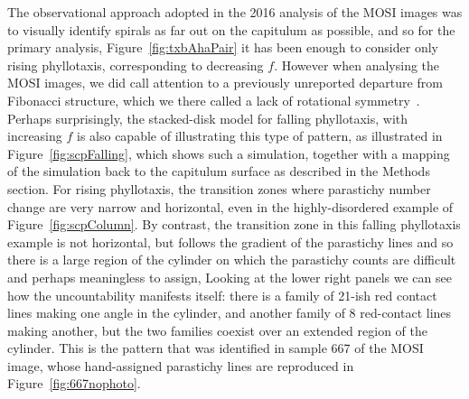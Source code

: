 The observational approach adopted in the 2016 analysis of the MOSI images was to visually identify spirals as far out on the capitulum as possible, and so for the primary analysis, Figure~\ref{fig:txbAhaPair} it has been enough to consider only rising phyllotaxis, corresponding to decreasing $f$. 
However when analysing the MOSI images, we did call attention to a previously unreported departure from Fibonacci structure, which we there called a lack of rotational symmetry~\cite{swintonNovelFibonacciNonFibonacci2016}. Perhaps surprisingly, the stacked-disk model for falling phyllotaxis, with increasing $f$ is also capable of illustrating this type of pattern, as illustrated in Figure~\ref{fig:scpFalling}, which 
shows such a simulation, together with a mapping of the simulation back to the capitulum surface as described in the Methods section. 
For rising phyllotaxis, the transition zones where parastichy number change are very narrow and horizontal, even in the highly-disordered example of Figure~\ref{fig:scpColumn}. By contrast, the transition zone in this falling phyllotaxis example is not horizontal, but follows the gradient of the parastichy lines and so  there is a large region of the cylinder on which the parastichy counts are difficult and perhaps meaningless to assign, Looking at the lower right panels we can see how the uncountability manifests itself: there is a family of 21-ish red contact lines making one angle in the cylinder, and another family of 8 red-contact lines making another, but the two families coexist over an extended region of the cylinder. This is the pattern that was identified in sample 667 of the MOSI image, whose hand-assigned parastichy lines are reproduced in Figure~\ref{fig:667nophoto}.
 



